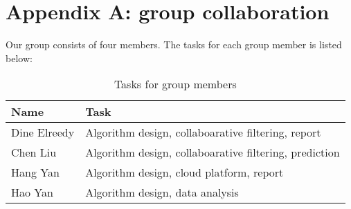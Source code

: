 \section*{Appendix A: group collaboration}
Our group consists of four members. The tasks for each group member is listed below:
\begin{table}[!ht]
  \centering
  \begin{tabular}{|p{5cm}|p{8cm}|}
    \hline
    Name  & Task\\
    \hline
    Dine Elreedy & Algorithm design, collaboarative filtering, report\\
    \hline
    Chen Liu & Algorithm design, collaboarative filtering, prediction\\
    \hline
    Hang Yan & Algorithm design, cloud platform, report\\
    \hline
    Hao Yan & Algorithm design, data analysis\\
    \hline
  \end{tabular}
  \caption{Tasks for group members}
  \label{tab:group}
\end{table}

